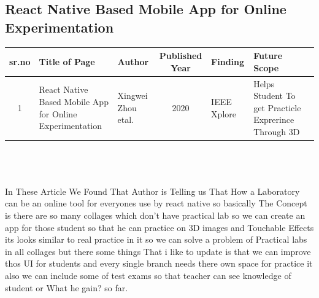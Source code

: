 \documentclass[12pt,a4paper]{article}
\begin{document}
\subsection*{React Native Based Mobile App for Online Experimentation}
\begin{tabular}{ |c | m{2.5cm} | m{2cm}| c | m{2cm} | m{2cm} | c | }

  \hline
  sr.no & Title of Page & Author & Published Year & Finding & Future Scope  \\ 
  \hline
  1 & React Native Based Mobile App for Online Experimentation & Xingwei Zhou etal. &  2020 & IEEE Xplore & Helps Student To  get Practicle Exprerince Through 3D \\
\hline 
  
\end{tabular}
\\
\\
\\
In These Article We Found That Author is Telling us That How a Laboratory can be an online tool for everyones use by react native so basically The Concept is there are so many collages which don't have 
practical lab so we can create an app for those student so that he can practice on 3D images and Touchable Effects its looks similar to real practice in it so we can solve a problem of Practical labs in all collages but there some things That i like to update is that we can improve thos UI for students and every single branch needs there own space for practice it also we can include some of test exams so that teacher can see knowledge of student or What he gain? so far.
\\
\\
\newpage
\end{document}
